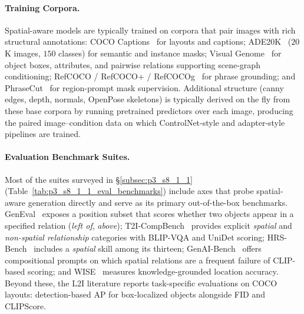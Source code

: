 \paragraph{Training Corpora.}
Spatial-aware models are typically trained on corpora that pair images with rich structural annotations: COCO Captions~\cite{lin2014microsoft} for layouts and captions; ADE20K~\cite{zhou2017ade20k} ($20$K images, $150$ classes) for semantic and instance masks; Visual Genome~\cite{krishna2017visual} for object boxes, attributes, and pairwise relations supporting scene-graph conditioning; RefCOCO / RefCOCO+ / RefCOCOg~\cite{yu2016modeling} for phrase grounding; and PhraseCut~\cite{wu2020phrasecut} for region-prompt mask supervision.
Additional structure (canny edges, depth, normals, OpenPose skeletons) is typically derived on the fly from these base corpora by running pretrained predictors over each image, producing the paired image--condition data on which ControlNet-style and adapter-style pipelines are trained.

\paragraph{Evaluation Benchmark Suites.}
Most of the suites surveyed in §\ref{subsec:p3_s8_1_1} (Table~\ref{tab:p3_s8_1_1_eval_benchmarks}) include axes that probe spatial-aware generation directly and serve as its primary out-of-the-box benchmarks.
GenEval~\cite{ghosh2023geneval} exposes a position subset that scores whether two objects appear in a specified relation (\emph{left of}, \emph{above}); T2I-CompBench~\cite{huang2023t2icompbench} provides explicit \emph{spatial} and \emph{non-spatial relationship} categories with BLIP-VQA and UniDet scoring; HRS-Bench~\cite{bakr2023hrsbench} includes a \emph{spatial} skill among its thirteen; GenAI-Bench~\cite{li2024genaibench} offers compositional prompts on which spatial relations are a frequent failure of CLIP-based scoring; and WISE~\cite{niu2025wise} measures knowledge-grounded location accuracy.
Beyond these, the L2I literature reports task-specific evaluations on COCO layouts: detection-based AP for box-localized objects alongside FID and CLIPScore.

